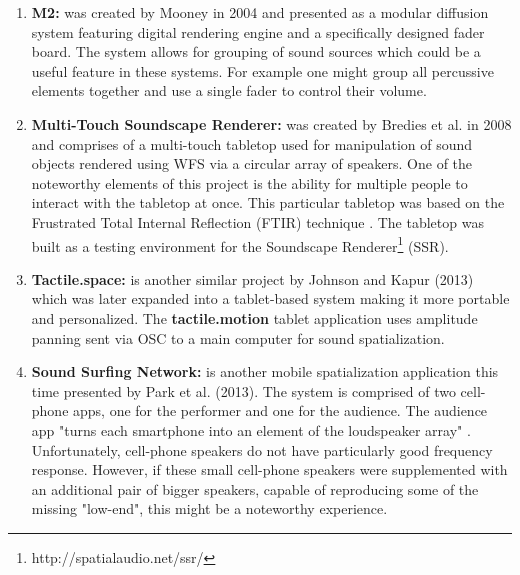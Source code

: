 \begin{enumerate}

    \item \textbf{M2:} was created by Mooney in 2004 and presented as a modular diffusion system featuring digital rendering engine and a specifically designed fader board. The system allows for grouping of sound sources which could be a useful feature in these systems. For example one might group all percussive elements together and use a single fader to control their volume.
    
    \item \textbf{Multi-Touch Soundscape Renderer:} \cite{bredies2008multi} was created by Bredies et al. in 2008 and comprises of a multi-touch tabletop used for manipulation of sound objects rendered using WFS via a circular array of speakers. One of the noteworthy elements of this project is the ability for multiple people to interact with the tabletop at once. This particular tabletop was based on the Frustrated Total Internal Reflection (FTIR) technique \cite{han2005low}. The tabletop was built as a testing environment for the Soundscape Renderer\footnote{http://spatialaudio.net/ssr/} (SSR).
    
    
    
    \item \textbf{Tactile.space:} is another similar project by Johnson and Kapur (2013) which was later expanded into a tablet-based system making it more portable and personalized. The \textbf{tactile.motion} tablet application uses amplitude panning sent via OSC to a main computer for sound spatialization. 
    
    \item \textbf{Sound Surfing Network:} is another mobile spatialization application this time presented by Park et al. (2013). The system is comprised of two cell-phone apps, one for the performer and one for the audience. The audience app "turns each smartphone into an element of the loudspeaker array" \cite{pysiewicz2017instruments}. Unfortunately, cell-phone speakers do not have particularly good frequency response. However, if these small cell-phone speakers were supplemented with an additional pair of bigger speakers, capable of reproducing some of the missing "low-end", this might be a noteworthy experience.
    

\end{enumerate}
